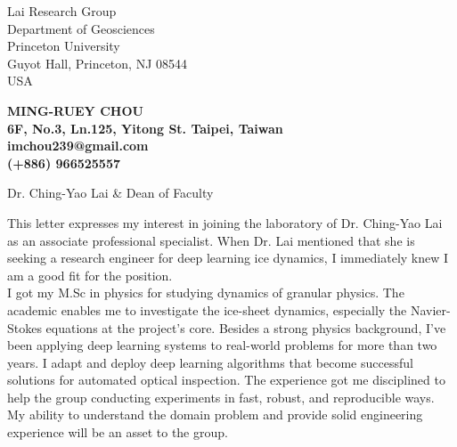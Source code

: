 \documentclass[12pt]{letter} %
\begin{document}

\begin{letter}{
Lai Research Group\\
Department of Geosciences\\
Princeton University\\
Guyot Hall, Princeton, NJ 08544\\
USA
} 


\begin{center}
\large\bf MING-RUEY CHOU\\ %
6F, No.3, Ln.125, Yitong St. Taipei, Taiwan\\imchou239@gmail.com\\(+886) 966525557%
\end{center} 
\vfill

\signature{Ming-Ruey Chou} %


\opening{Dr. Ching-Yao Lai \& Dean of Faculty} 

This letter expresses my interest in joining the laboratory of Dr. Ching-Yao Lai as an associate professional specialist.
When Dr. Lai mentioned that she is seeking a research engineer for deep learning ice dynamics, I immediately knew I am a good fit for the position.\\

I got my M.Sc in physics for studying dynamics of granular physics.
The academic enables me to investigate the ice-sheet dynamics, especially the Navier-Stokes equations at the project's core.
Besides a strong physics background, I've been applying deep learning systems to real-world problems for more than two years.
I adapt and deploy deep learning algorithms that become successful solutions for automated optical inspection.
The experience got me disciplined to help the group conducting experiments in fast, robust, and reproducible ways.
My ability to understand the domain problem and provide solid engineering experience will be an asset to the group.\\


\end{letter}
\end{document}
